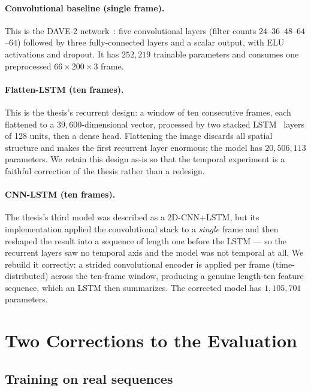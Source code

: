 \documentclass[11pt]{article}
\begin{document}
\paragraph{Convolutional baseline (single frame).}
This is the DAVE-2 network~\mbox{\citep{bojarski2016end}}: five convolutional layers
(filter counts $24$--$36$--$48$--$64$--$64$) followed by three fully-connected
layers and a scalar output, with ELU activations and dropout. It has $252{,}219$
trainable parameters and consumes one preprocessed $66\times200\times3$ frame.

\paragraph{Flatten-LSTM (ten frames).}
This is the thesis's recurrent design: a window of ten consecutive frames, each
flattened to a $39{,}600$-dimensional vector, processed by two stacked
LSTM~\mbox{\citep{hochreiter1997long}} layers of 128 units, then a dense head. Flattening
the image discards all spatial structure and makes the first recurrent layer
enormous; the model has $20{,}506{,}113$ parameters. We retain this design as-is so
that the temporal experiment is a faithful correction of the thesis rather than a
redesign.

\paragraph{CNN-LSTM (ten frames).}
The thesis's third model was described as a 2D-CNN+LSTM, but its implementation
applied the convolutional stack to a \emph{single} frame and then reshaped the
result into a sequence of length one before the LSTM --- so the recurrent layers saw
no temporal axis and the model was not temporal at all. We rebuild it correctly: a
strided convolutional encoder is applied per frame (time-distributed) across the
ten-frame window, producing a genuine length-ten feature sequence, which an LSTM
then summarizes. The corrected model has $1{,}105{,}701$ parameters.

\section{Two Corrections to the Evaluation}
\label{sec:corrections}

\subsection{Training on real sequences}
\end{document}
